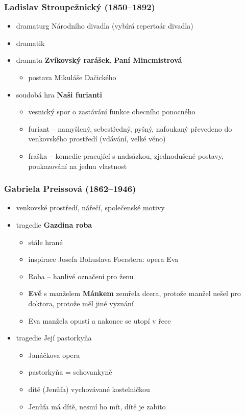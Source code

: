 \subsubsection{Ladislav Stroupežnický (1850--1892)}
\begin{itemize}
\item dramaturg Národního divadla (vybírá repertoár divadla)
\item dramatik 
\item dramata \textbf{Zvíkovský rarášek}, \textbf{Paní Mincmistrová}
	\begin{itemize}
	\item postava Mikuláše Dačického
	\end{itemize}
\item soudobá hra \textbf{Naši furianti}
	\begin{itemize}
	\item vesnický spor o zastávání funkce obecního ponocného
	\item furiant -- namyšlený, sebestředný, pyšný, nafoukaný \ra převedeno do venkovského prostředí (vdávání, velké věno)
	\item fraška -- komedie pracující s nadsázkou, zjednodušené postavy, poukazování na jednu vlastnost
	\end{itemize}
\end{itemize}

\subsubsection{Gabriela Preissová (1862--1946)}
\begin{itemize}
\item venkovské prostředí, nářečí, společenské motivy
\item tragedie \textbf{Gazdina roba}
	\begin{itemize}
	\item stále hrané
	\item inspirace Josefa Bohuslava Foerstera: opera Eva
	\item Roba -- hanlivé označení pro ženu
	\item \textbf{Evě} s manželem \textbf{Mánkem} zemřela dcera, protože manžel nešel pro doktora, protože měl jiné vyznání
	\item Eva manžela opustí a nakonec se utopí v řece
	\end{itemize}
\item tragedie Její pastorkyňa
	\begin{itemize}
	\item Janáčkova opera
	\item pastorkyňa = schovankyně
	\item dítě (Jenůfa) vychovávané kostelničkou
	\item Jenůfa má dítě, nesmí ho mít, dítě je zabito 
	\end{itemize}
\end{itemize}

